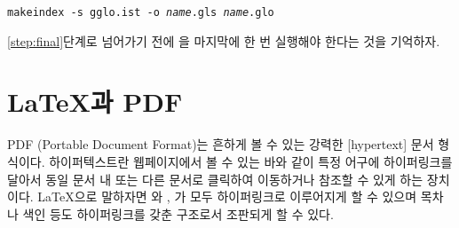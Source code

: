 \noindent\texttt{makeindex -s gglo.ist -o \textit{name}.gls \textit{name}.glo}

\noindent \ref{step:final}단계로 넘어가기 전에 \XeLaTeX 을 마지막에 한 번 실행해야 한다는 것을 기억하자.


\section{\LaTeX 과 PDF}
\label{sec:pdftex}
%
PDF (Portable Document Format)는 흔하게 볼 수 있는 강력한 [hypertext] 문서 형식이다. 하이퍼텍스트란 웹페이지에서 볼 수 있는 바와 같이 특정 어구에 하이퍼링크를 달아서 동일 문서 내 또는 다른 문서로 클릭하여 이동하거나 참조할 수 있게 하는 장치이다. \LaTeX 으로 말하자면 와 , 가 모두 하이퍼링크로 이루어지게 할 수 있으며 목차나 색인 등도 하이퍼링크를 갖춘 구조로서 조판되게 할 수 있다.


